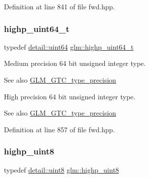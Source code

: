 Definition at line 841 of file fwd.\+hpp.

\mbox{\label{group__gtc__type__precision_ga6e66f40c5909bfc872b068187fa6029e}} 
\subsubsection{\texorpdfstring{highp\+\_\+uint64\+\_\+t}{highp\_uint64\_t}}
{\footnotesize\ttfamily typedef \hyperlink{namespaceglm_1_1detail_adec4b19bf4982125e122db2fe03c5810}{detail\+::uint64} \hyperlink{group__gtc__type__precision_ga6e66f40c5909bfc872b068187fa6029e}{glm\+::highp\+\_\+uint64\+\_\+t}}

Medium precision 64 bit unsigned integer type. \begin{DoxySeeAlso}{See also}
\hyperlink{group__gtc__type__precision}{G\+L\+M\+\_\+\+G\+T\+C\+\_\+type\+\_\+precision}
\end{DoxySeeAlso}
High precision 64 bit unsigned integer type. \begin{DoxySeeAlso}{See also}
\hyperlink{group__gtc__type__precision}{G\+L\+M\+\_\+\+G\+T\+C\+\_\+type\+\_\+precision} 
\end{DoxySeeAlso}


Definition at line 857 of file fwd.\+hpp.

\mbox{\label{group__gtc__type__precision_ga2c27c6dd26e893786f04b10f99c1ee95}} 
\subsubsection{\texorpdfstring{highp\+\_\+uint8}{highp\_uint8}}
{\footnotesize\ttfamily typedef \hyperlink{namespaceglm_1_1detail_aef2588f97d090cc19fbbe0c74fe17c8f}{detail\+::uint8} \hyperlink{group__gtc__type__precision_ga2c27c6dd26e893786f04b10f99c1ee95}{glm\+::highp\+\_\+uint8}}

